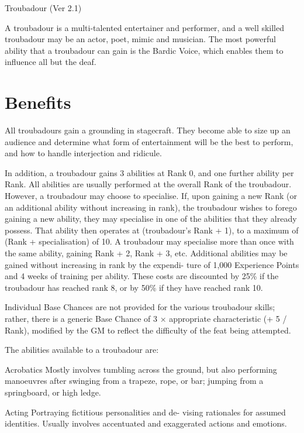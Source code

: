\begin{Chapter}{Troubadour (Ver 2.1)}

A troubadour is a multi-talented entertainer and performer, and a well
skilled troubadour may be an actor, poet, mimic and musician. The most
powerful ability that a troubadour can gain is the Bardic Voice,
which enables them to influence all but the deaf.

\section{Benefits}
All troubadours gain a grounding in stagecraft.  They become able to
size up an audience and determine what form of entertainment will be
the best to perform, and how to handle interjection and ridicule.

In addition, a troubadour gains 3 abilities at Rank 0, and one further
ability per Rank. All abilities are usually performed at the overall
Rank of the troubadour.  However, a troubadour may choose to
specialise.  If, upon gaining a new Rank (or an additional ability
without increasing in rank), the troubadour wishes to forego gaining a
new ability, they may specialise in one of the abilities that they
already possess. That ability then operates at (troubadour’s Rank +
1), to a maximum of (Rank + specialisation) of 10.  A troubadour may
specialise more than once with the same ability, gaining Rank + 2,
Rank + 3, etc.  Additional abilities may be gained without increasing
in rank by the expendi- ture of 1,000 Experience Points and 4 weeks of
training per ability.  These costs are discounted by 25\% if the
troubadour has reached rank 8, or by 50\% if they have reached rank
10.

Individual Base Chances are not provided for the various troubadour
skills; rather, there is a generic Base Chance of 3 × appropriate
characteristic (+ 5 / Rank), modified by the GM to reflect the
difficulty of the feat being attempted.

The abilities available to a troubadour are:

\begin{Description}
\item[Acrobatics] Mostly involves tumbling across the ground, but also
  performing manoeuvres after swinging from a trapeze, rope, or bar;
  jumping from a springboard, or high ledge.

\item[Acting] Portraying fictitious personalities and de- vising
  rationales for assumed identities.  Usually involves accentuated and
  exaggerated actions and emotions.


\end{Description}
\end{Chapter}
